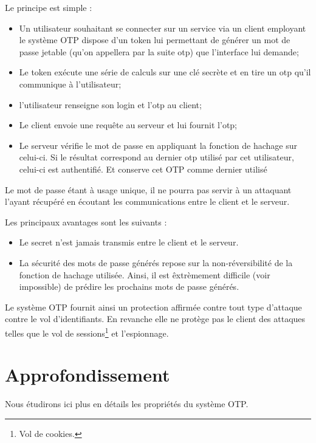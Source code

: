 \documentclass{../res/univ-projet}
\begin{document}
  Le principe est simple :

  \begin{itemize}
    \item Un utilisateur souhaitant se connecter sur un service via un client
    employant le système OTP dispose d'un token lui permettant de générer un 
    mot de passe jetable 
    (qu'on appellera par la suite otp) que l'interface lui demande;
    \item Le token exécute une série de calculs sur une clé secrète et en tire 
    un otp qu'il communique à l'utilisateur;
    \item l'utilisateur renseigne son login et l'otp au client;
    \item Le client envoie une requ\^ete au serveur et lui fournit l'otp; 
    \item Le serveur vérifie le mot de passe en appliquant la fonction de 
    hachage sur celui-ci. Si le résultat correspond au dernier otp utilisé par cet 
    utilisateur, celui-ci est authentifié. Et conserve cet OTP comme dernier
    utilisé\\
  \end{itemize}

  Le mot de passe étant à usage unique, il ne pourra pas servir à un attaquant 
l'ayant récupéré en écoutant les communications entre le client et le serveur.

  Les principaux avantages sont les suivants :

  \begin{itemize}
    \item Le secret n'est jamais transmis entre le client et le serveur.
    \item La sécurité des mots de passe générés repose sur la non-réversibilité 
    de la fonction de hachage utilisée. Ainsi, il est \^extrèmement difficile (voir 
    impossible) de prédire les prochains mots de passe générés.\\
  \end{itemize}

  Le système OTP fournit ainsi un protection affirmée contre tout type 
  d'attaque contre le vol d'identifiants.
  En revanche elle ne protège pas le client des attaques telles 
  que le vol de sessions\footnote{Vol de cookies.} et l'espionnage.

\section{Approfondissement}
  Nous étudirons ici plus en détails les propriétés du système OTP.
\end{document}
